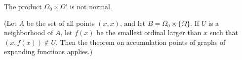 The product $\Omega_0 \times \Omega'$ is not normal.

(Let $A$ be the set of all points $(x, x)$, and let $B = \Omega_0 \times \{\Omega\}$. If $U$ is a neighborhood of $A$, let $f(x)$ be the smallest ordinal larger than $x$ such that $(x, f(x)) \notin U$. Then the theorem on accumulation points of graphs of expanding functions applies.)
